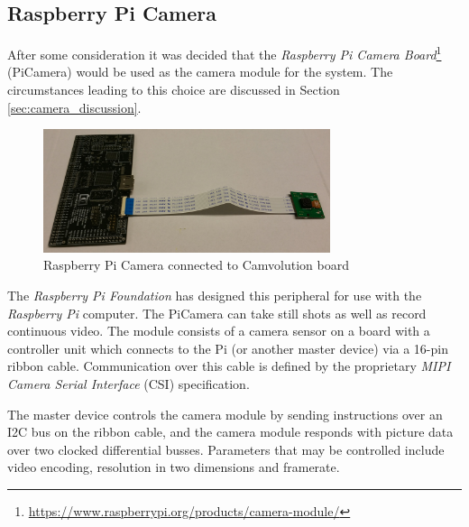 \subsection{Raspberry Pi Camera}
After some consideration it was decided that the \textit{Raspberry Pi Camera Board}\footnote{\url{https://www.raspberrypi.org/products/camera-module/}} (PiCamera) would be used as the camera module for the system.
The circumstances leading to this choice are discussed in Section \ref{sec:camera_discussion}.

\begin{figure}[h]
    \centering
    \includegraphics[width=0.75\textwidth]{img/picamera}
    \caption{Raspberry Pi Camera connected to Camvolution board}
\end{figure}

The \textit{Raspberry Pi Foundation} has designed this peripheral for use with the \textit{Raspberry Pi} computer.
The PiCamera can take still shots as well as record continuous video.
The module consists of a camera sensor on a board with a controller unit which connects to the Pi (or another master device) via a 16-pin ribbon cable.
Communication over this cable is defined by the proprietary \textit{MIPI Camera Serial Interface} (CSI) specification.

The master device controls the camera module by sending instructions over an I2C bus on the ribbon cable,
and the camera module responds with picture data over two clocked differential busses.\cite{picam-pinout}
Parameters that may be controlled include video encoding, resolution in two dimensions and framerate.

